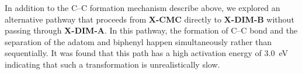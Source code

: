 \documentclass[%
 reprint,
 amsmath,amssymb,
 aps,
prb,
floatfix,
]{revtex4-2}
\newcommand{\zhzh}{\color{blue}}
\newcommand{\zhzh}{\color{blue}}
\newcommand{\sinfo}{Supplementary Information}
\begin{document}
{In addition to the C--C formation mechanism describe above, we explored an alternative pathway that proceeds from \textbf{X-CMC} directly to \textbf{X-DIM-B} without passing through \textbf{X-DIM-A}. In this pathway, the formation of C--C bond and the separation of the adatom and biphenyl happen simultaneously rather than sequentially. It was found that this path has a high activation energy of \SI{3.0}{\electronvolt} indicating that such a transformation is unrealistically slow. 





}
\end{document}
